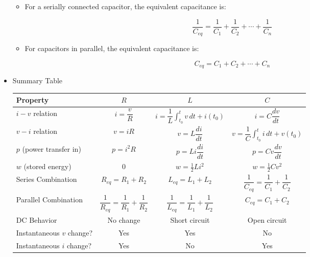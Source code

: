 \begin{itemize}
\begin{itemize}
      \item For a serially connected capacitor, the equivalent capacitance is:

        $$\boxed{\dfrac{1}{C_{eq}}=\dfrac{1}{C_1}+\dfrac{1}{C_2}+\cdots+\dfrac{1}{C_n}}$$

      \item For capacitors in parallel, the equivalent capacitance is:

        $$\boxed{C_{eq}=C_1+C_2+\cdots+C_n}$$

    \end{itemize}

  \item Summary Table

    \renewcommand{\arraystretch}{2.5}
  \begin{center}
    \begin{tabular}[H]{| l c c c |}
      \hline
      Property & $R$ & $L$ & $C$\\
      \hline
      $i-v$ relation & $i=\dfrac{v}{R}$ & $i=\dfrac{1}{L}\displaystyle \int_{t_0}^t v\,dt + i(t_0)$ & $i=C\dfrac{dv}{dt}$\\
      $v-i$ relation & $v=iR$ & $v=L\dfrac{di}{dt}$ & $v=\dfrac{1}{C}\displaystyle \int_{t_0}^t i\,dt+v(t_0)$\\
      $p$ (power transfer in) & $p=i^2R$ & $p=Li\dfrac{di}{dt}$ & $p=Cv\dfrac{dv}{dt}$\\
      $w$ (stored energy) & 0 & $w=\frac{1}{2}Li^2$ & $w=\frac{1}{2}Cv^2$\\
      Series Combination & $R_{eq}=R_1+R_2$ & $L_{eq}=L_1+L_2$ & $\dfrac{1}{C_{eq}}=\dfrac{1}{C_1}+\dfrac{1}{C_2}$\\
      Parallel Combination & $\dfrac{1}{R_{eq}}=\dfrac{1}{R_1}+\dfrac{1}{R_2}$ & $\dfrac{1}{L_{eq}}=\dfrac{1}{L_1}+\dfrac{1}{L_2}$ & $C_{eq}=C_1+C_2$\\
      DC Behavior & No change & Short circuit & Open circuit \\
      Instantaneous $v$ change? & Yes & Yes & No\\
      Instantaneous $i$ change? & Yes & No & Yes\\
      \hline
    \end{tabular}
  \end{center}

\end{itemize}




